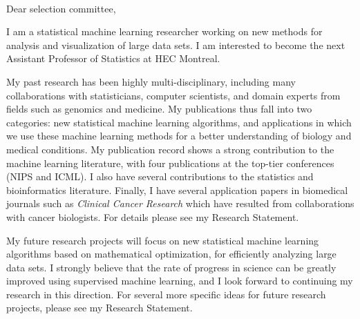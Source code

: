 \documentclass{article}
\begin{document}
\mbox{ }

Dear selection committee,

I am a 
statistical 
machine learning researcher working on new methods for
analysis and visualization of large data sets.
I am interested to become the next
Assistant Professor of Statistics at HEC Montreal.

My past research has been highly multi-disciplinary, including many
collaborations with 
statisticians,
 computer scientists,
and domain experts from fields such as genomics and medicine. 
My
publications thus fall into two categories: new statistical machine
learning algorithms, and applications in which we use these machine
learning methods for a better understanding of 
biology and medical conditions. 
My publication record shows a strong
contribution to the machine learning literature, with four
publications at the top-tier conferences (NIPS and ICML). I also have
several contributions to the statistics 
and bioinformatics 
literature.
Finally, I have several application papers in biomedical journals such
as {\it Clinical Cancer Research} which have resulted from
collaborations with cancer biologists. For details please see my
Research Statement. 

My future research projects will focus on new statistical machine
learning algorithms based on mathematical optimization, for
efficiently analyzing large data sets. I strongly believe that the
rate of progress in science can be greatly improved using supervised
machine learning, and I look forward to continuing my research in this
direction. For several more specific ideas for future research
projects, please see my Research Statement.

\end{document}
